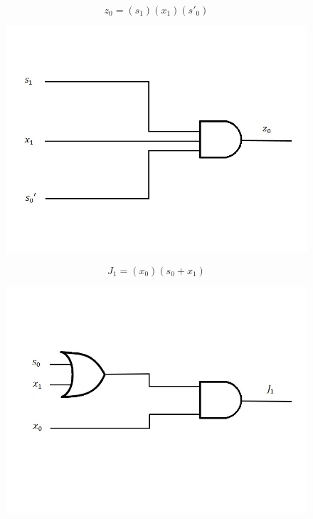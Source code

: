 \documentclass{article}
\begin{document}
\clearpage

\begin{equation*}
z_0 = (s_1)(x_1)(s'_0)
\end{equation*}
\begin{figure}[h!]
\centering
\includegraphics[scale=0.3]{z0}
\end{figure}

\begin{equation*}
J_1 = (x_0)(s_0 + x_1)
\end{equation*}
\begin{figure}[h!]
\centering
\includegraphics[scale=0.3]{J1}
\end{figure}

\clearpage
\end{document}
